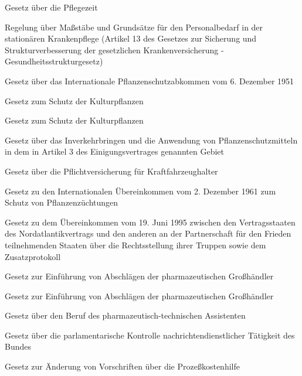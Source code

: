 \item[{PflegeZG}] Gesetz über die Pflegezeit

\item[{PflPersRgl}] Regelung über Maßstäbe und Grundsätze für den Personalbedarf in der stationären Krankenpflege (Artikel 13 des Gesetzes zur Sicherung und Strukturverbesserung der gesetzlichen Krankenversicherung - Gesundheitsstrukturgesetz)

\item[{PflSchAbkG}] Gesetz über das Internationale Pflanzenschutzabkommen vom 6. Dezember 1951

\item[{PflSchG-1986}] Gesetz zum Schutz der Kulturpflanzen

\item[{PflSchG-2012}] Gesetz zum Schutz der Kulturpflanzen

\item[{PflSchMVerkG}] Gesetz über das Inverkehrbringen und die Anwendung von Pflanzenschutzmitteln in dem in Artikel 3 des Einigungsvertrages genannten Gebiet

\item[{PflVG}] Gesetz über die Pflichtversicherung für Kraftfahrzeughalter

\item[{PflZSchÜbkG}] Gesetz zu den Internationalen Übereinkommen vom 2. Dezember 1961 zum Schutz von Pflanzenzüchtungen

\item[{PfPTrStatG}] Gesetz zu dem Übereinkommen vom 19. Juni 1995 zwischen den Vertragsstaaten des Nordatlantikvertrags und den anderen an der Partnerschaft für den Frieden teilnehmenden Staaten über die Rechtsstellung ihrer Truppen sowie dem Zusatzprotokoll

\item[{PharmAbschlG}] Gesetz zur Einführung von Abschlägen der pharmazeutischen Großhändler

\item[{PharmAbschlG-2011}] Gesetz zur Einführung von Abschlägen der pharmazeutischen Großhändler

\item[{PharmTAG}] Gesetz über den Beruf des pharmazeutisch-technischen Assistenten

\item[{PKGrG}] Gesetz über die parlamentarische Kontrolle nachrichtendienstlicher Tätigkeit des Bundes

\item[{PKHÄndG}] Gesetz zur Änderung von Vorschriften über die Prozeßkostenhilfe

